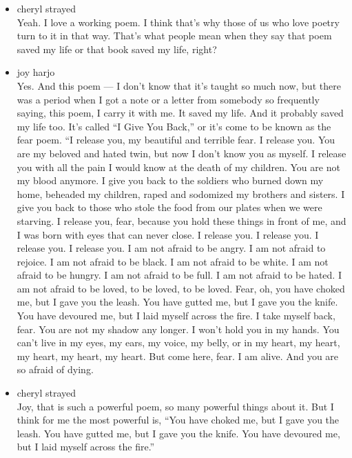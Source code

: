 \begin{itemize}
\item
  cheryl strayed\\
  Yeah. I love a working poem. I think that's why those of us who love
  poetry turn to it in that way. That's what people mean when they say
  that poem saved my life or that book saved my life, right?
\item
  joy harjo\\
  Yes. And this poem --- I don't know that it's taught so much now, but
  there was a period when I got a note or a letter from somebody so
  frequently saying, this poem, I carry it with me. It saved my life.
  And it probably saved my life too. It's called ``I Give You Back,'' or
  it's come to be known as the fear poem. ``I release you, my beautiful
  and terrible fear. I release you. You are my beloved and hated twin,
  but now I don't know you as myself. I release you with all the pain I
  would know at the death of my children. You are not my blood anymore.
  I give you back to the soldiers who burned down my home, beheaded my
  children, raped and sodomized my brothers and sisters. I give you back
  to those who stole the food from our plates when we were starving. I
  release you, fear, because you hold these things in front of me, and I
  was born with eyes that can never close. I release you. I release you.
  I release you. I release you. I am not afraid to be angry. I am not
  afraid to rejoice. I am not afraid to be black. I am not afraid to be
  white. I am not afraid to be hungry. I am not afraid to be full. I am
  not afraid to be hated. I am not afraid to be loved, to be loved, to
  be loved. Fear, oh, you have choked me, but I gave you the leash. You
  have gutted me, but I gave you the knife. You have devoured me, but I
  laid myself across the fire. I take myself back, fear. You are not my
  shadow any longer. I won't hold you in my hands. You can't live in my
  eyes, my ears, my voice, my belly, or in my heart, my heart, my heart,
  my heart, my heart. But come here, fear. I am alive. And you are so
  afraid of dying.
\item
  cheryl strayed\\
  Joy, that is such a powerful poem, so many powerful things about it.
  But I think for me the most powerful is, ``You have choked me, but I
  gave you the leash. You have gutted me, but I gave you the knife. You
  have devoured me, but I laid myself across the fire.''


\end{itemize}
